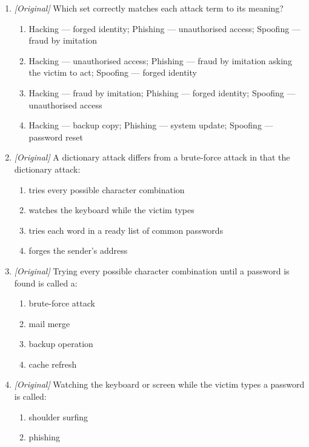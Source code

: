 \begin{enumerate}[label=\textbf{Q\arabic*.}, leftmargin=*]
\begin{enumerate}[label=\Alph*.]
    \item mail merge
    \item archiving
    \item forwarding
  \end{enumerate}
\item \textit{[Original]} Which set correctly matches each attack term to
  its meaning?
  \begin{enumerate}[label=\Alph*.]
    \item Hacking --- forged identity; Phishing --- unauthorised access; Spoofing --- fraud by imitation
    \item Hacking --- unauthorised access; Phishing --- fraud by imitation asking the victim to act; Spoofing --- forged identity
    \item Hacking --- fraud by imitation; Phishing --- forged identity; Spoofing --- unauthorised access
    \item Hacking --- backup copy; Phishing --- system update; Spoofing --- password reset
  \end{enumerate}
\item \textit{[Original]} A dictionary attack differs from a brute-force
  attack in that the dictionary attack:
  \begin{enumerate}[label=\Alph*.]
    \item tries every possible character combination
    \item watches the keyboard while the victim types
    \item tries each word in a ready list of common passwords
    \item forges the sender's address
  \end{enumerate}
\item \textit{[Original]} Trying every possible character combination until
  a password is found is called a:
  \begin{enumerate}[label=\Alph*.]
    \item brute-force attack
    \item mail merge
    \item backup operation
    \item cache refresh
  \end{enumerate}
\item \textit{[Original]} Watching the keyboard or screen while the victim
  types a password is called:
  \begin{enumerate}[label=\Alph*.]
    \item shoulder surfing
    \item phishing

\end{enumerate}
\end{enumerate}

